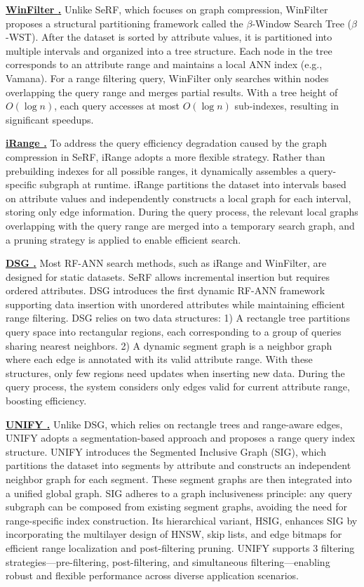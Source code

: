 \documentclass[sigconf, nonacm]{acmart}
\begin{document}
	
	\noindent\textbf{\underline{WinFilter \cite{winFilter}.}}  
	Unlike SeRF, which focuses on graph compression, WinFilter proposes a structural partitioning framework called the $\beta$-Window Search Tree ($\beta$-WST). After the dataset is sorted by attribute values, it is partitioned into multiple intervals and organized into a tree structure. Each node in the tree corresponds to an attribute range and maintains a local ANN index (e.g., Vamana). For a range filtering query, WinFilter only searches within nodes overlapping the query range and merges partial results. With a tree height of $O(\log n)$, each query accesses at most $O(\log n)$ sub-indexes, resulting in significant speedups.
	
	\noindent\textbf{\underline{iRange \cite{iRangeGraph}.}}  
	To address the query efficiency degradation caused by the graph compression in SeRF, iRange adopts a more flexible strategy. Rather than prebuilding indexes for all possible ranges, it dynamically assembles a query-specific subgraph at runtime. iRange partitions the dataset into intervals based on attribute values and independently constructs a local graph for each interval, storing only edge information. During the query process, the relevant local graphs overlapping with the query range are merged into a temporary search graph, and a pruning strategy is applied to enable efficient search.
	
	\noindent\textbf{\underline{DSG \cite{DSG}.}}   
	Most RF-ANN search methods, such as iRange and WinFilter, are designed for static datasets. SeRF allows incremental insertion but requires ordered attributes. DSG introduces the first dynamic RF-ANN framework supporting data insertion with unordered attributes while maintaining efficient range filtering.
	DSG relies on two data structures: 1) A rectangle tree partitions query space into rectangular regions, each corresponding to a group of queries sharing nearest neighbors. 2) A dynamic segment graph is a neighbor graph where each edge is annotated with its valid attribute range.
	With these structures, only few regions need updates when inserting new data. During the query process, the system considers only edges valid for current attribute range, boosting efficiency.
	
	\noindent\textbf{\underline{UNIFY \cite{UNIFY}.}}  
	Unlike DSG, which relies on rectangle trees and range-aware edges, UNIFY adopts a segmentation-based approach and proposes a range query index structure. UNIFY introduces the Segmented Inclusive Graph (SIG), which partitions the dataset into segments by attribute and constructs an independent neighbor graph for each segment. These segment graphs are then integrated into a unified global graph. SIG adheres to a graph inclusiveness principle: any query subgraph can be composed from existing segment graphs, avoiding the need for range-specific index construction. Its hierarchical variant, HSIG, enhances SIG by incorporating the multilayer design of HNSW, skip lists, and edge bitmaps for efficient range localization and post-filtering pruning. UNIFY supports 3 filtering strategies—pre-filtering, post-filtering, and  simultaneous filtering—enabling robust and flexible performance across diverse application scenarios.
	
\end{document}
